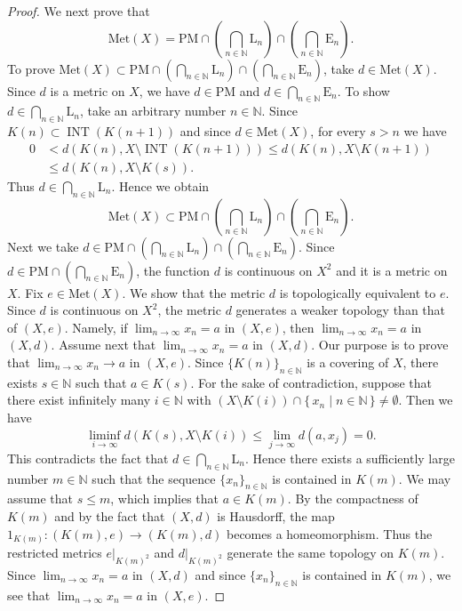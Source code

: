 \documentclass[10pt,a4paper]{amsart}
\DeclareMathOperator{\nai}{INT}
\newcommand{\met}[1]{\mathrm{Met}(#1)}
\newcommand{\nn}{\mathbb{N}}
\newcommand{\yoeset}[1]{\mathrm{E}_{#1}}
\newcommand{\yokset}[1]{K(#1)}
\newcommand{\yolset}[1]{\mathrm{L}_{#1}}
\newcommand{\yopset}{\mathrm{PM}}
\begin{document}
\begin{proof}
We next prove that
\[
	\met{X}=
	\yopset
	\cap 
	\left(
	\bigcap_{n\in \nn} \yolset{n}
	\right)
	\cap  
	\left(
	\bigcap_{n\in \nn}\yoeset{n}
	\right). 
\]
To prove
$\met{X}\subset
	\yopset
	\cap 
	\left(
	\bigcap_{n\in \nn} \yolset{n}
	\right)
	\cap  
	\left(
	\bigcap_{n\in \nn}\yoeset{n}
	\right)$, 
take 
$d\in \met{X}$. 
Since 
$d$
 is a metric on 
 $X$, 
we have
 $d\in \yopset$ 
and  
$d\in \bigcap_{n\in \nn}\yoeset{n}$. 
To show 
$d\in \bigcap_{n\in \nn}\yolset{n}$,  
take an arbitrary number 
$n\in \nn$. 
Since 
$\yokset{n}\subset \nai(\yokset{n+1})$ 
and 
since 
$d\in \met{X}$, 
for every 
$s> n$ 
we have 
\begin{align*}
	0&<d(\yokset{n}, X\setminus \nai(\yokset{n+1}))
	\le
	d(\yokset{n}, X\setminus \yokset{n+1})
	\\
	&\le
	d(\yokset{n}, X\setminus \yokset{s}).
\end{align*}
Thus  
$d\in \bigcap_{n\in \nn}\yolset{n}$. 
Hence we obtain
\[
	\met{X}
	\subset 
	\yopset
	\cap 
	\left(
	\bigcap_{n\in \nn} \yolset{n}
	\right)
	\cap
	\left(
	\bigcap_{n\in \nn}\yoeset{n}
	\right). 
\]
Next we  take 
$d\in \yopset\cap \left(\bigcap_{n\in \nn} \yolset{n}\right)\cap  \left(\bigcap_{n\in \nn}\yoeset{n}\right)$. 
Since 
$d\in \yopset\cap \left( \bigcap_{n\in \nn}\yoeset{n}\right)$, 
the function 
$d$ 
is  continuous on 
$X^{2}$ 
and it is  a metric on 
$X$. 
Fix 
$e\in \met{X}$. 
We show that  
the metric  
$d$ 
is topologically equivalent to
 $e$. 
Since 
$d$ 
is continuous on 
 $X^{2}$, 
the metric
 $d$ 
 generates a weaker topology than that of
  $(X, e)$. 
Namely, 
if 
$\lim_{n\to \infty}x_{n}= a$ 
in 
$(X, e)$, 
then 
$\lim_{n\to \infty}x_{n}=a$ 
in 
$(X, d)$. 
Assume next  that 
$\lim_{n\to \infty}x_{n}= a$
 in 
 $(X, d)$. 
Our purpose is 
to prove 
that 
$\lim_{n\to \infty}x_{n}\to a$
in 
$(X, e)$. 
Since 
$\{\yokset{n}\}_{n\in \nn}$ 
is a covering of 
$X$, 
there exists 
$s\in \nn$
such that 
$a\in \yokset{s}$. 
For the sake of contradiction, 
suppose that 
there exist infinitely many 
$i\in \nn$ 
with
 $(X\setminus \yokset{i})\cap \{\, x_{n}\mid {n\in \nn}\, \}\neq \emptyset$. 
Then we have
\[
	\liminf_{i\to \infty}d(\yokset{s}, X\setminus \yokset{i})
	\le 
	\lim_{j\to \infty}d(a, x_{j})
	=
	0.
\] 
This contradicts the fact that 
$d\in \bigcap_{n\in \nn}\yolset{n}$. 
Hence there exists 
a sufficiently large number 
$m\in \nn$ 
such that  
the sequence 
$\{x_{n}\}_{n\in \nn}$ 
is contained in 
$\yokset{m}$. 
 We may assume that 
 $s\le m$, which implies that 
 $a\in \yokset{m}$. 
By the compactness of 
$\yokset{m}$ and by 
the fact that 
$(X, d)$ 
is Hausdorff, 
the map 
$1_{\yokset{m}}\colon (\yokset{m}, e)\to (\yokset{m}, d)$
becomes a homeomorphism. 
Thus 
the restricted metrics 
$e|_{\yokset{m}^{2}}$ and 
$d|_{\yokset{m}^{2}}$ 
generate the same topology on 
$\yokset{m}$. 
Since  
$\lim_{n\to\infty}x_{n}=a$ in $(X, d)$
and since 
$\{x_{n}\}_{n\in \nn}$
 is 
 contained in 
$\yokset{m}$, 
we see that 
$\lim_{n\to\infty}x_{n}=a$
in 
$(X, e)$. 


\end{proof}
\end{document}

